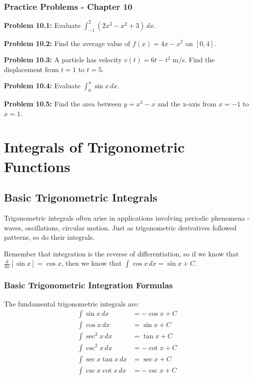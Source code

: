 \documentclass[12pt,a4paper]{book}
\theoremstyle{definition}
\begin{document}
\subsection{Practice Problems - Chapter 10}

\textbf{Problem 10.1:} Evaluate $\int_{-1}^2 (2x^3 - x^2 + 3) \, dx$.

\textbf{Problem 10.2:} Find the average value of $f(x) = 4x - x^2$ on $[0, 4]$.

\textbf{Problem 10.3:} A particle has velocity $v(t) = 6t - t^2$ m/s. Find the displacement from $t = 1$ to $t = 5$.

\textbf{Problem 10.4:} Evaluate $\int_0^{\pi} \sin x \, dx$.

\textbf{Problem 10.5:} Find the area between $y = x^3 - x$ and the x-axis from $x = -1$ to $x = 1$.

\chapter{Integrals of Trigonometric Functions}

\section{Basic Trigonometric Integrals}

\begin{intuition}
Trigonometric integrals often arise in applications involving periodic phenomena - waves, oscillations, circular motion. Just as trigonometric derivatives followed patterns, so do their integrals.

Remember that integration is the reverse of differentiation, so if we know that $\frac{d}{dx}[\sin x] = \cos x$, then we know that $\int \cos x \, dx = \sin x + C$.
\end{intuition}

\subsection{Basic Trigonometric Integration Formulas}

\begin{keyformula}
The fundamental trigonometric integrals are:
\begin{align}
\int \sin x \, dx &= -\cos x + C\\
\int \cos x \, dx &= \sin x + C\\
\int \sec^2 x \, dx &= \tan x + C\\
\int \csc^2 x \, dx &= -\cot x + C\\
\int \sec x \tan x \, dx &= \sec x + C\\
\int \csc x \cot x \, dx &= -\csc x + C
\end{align}
\end{keyformula}
\end{document}
